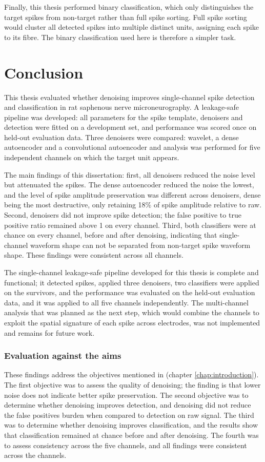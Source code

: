 \documentclass[ %
                    author={Rzan Alkabier},
                    supervisor={Dr. Zahraa Abdallah},
                    degree={MSc},
                     title={Denoising Extracellular Recording for Spike Detection and Classification on Single Channels},
                    subtitle={Does denoising improve detection and classification performance?},
                      type={},
                      year={2026}]{dissertation}
\begin{document}
\noindent
Finally, this thesis performed binary classification, which only distinguishes the target spikes from non-target rather than full spike sorting. Full spike sorting would cluster all detected spikes into multiple distinct units, assigning each spike to its fibre. The binary classification used here is therefore a simpler task. 
\chapter{Conclusion}
\label{chap:conclusion}
This thesis evaluated whether denoising improves single-channel spike detection and classification in rat saphenous nerve microneurography. A leakage-safe pipeline was developed: all parameters for the spike template, denoisers and detection were fitted on a development set, and performance was scored once on held-out evaluation data. Three denoisers were compared: wavelet, a dense autoencoder and a convolutional autoencoder and analysis was performed for five independent channels on which the target unit appears.  
\bigskip

\noindent
The main findings of this dissertation: first, all denoisers reduced the noise level but attenuated the spikes. The dense autoencoder reduced the noise the lowest, and the level of spike amplitude preservation was different across denoisers, dense being the most destructive, only retaining 18\% of spike amplitude relative to raw. Second, denoisers did not improve spike detection; the false positive to true positive ratio remained above 1 on every channel. Third, both classifiers were at chance on every channel, before and after denoising, indicating that single-channel waveform shape can not be separated from non-target spike waveform shape. These findings were consistent across all channels.
\bigskip

\noindent
The single-channel leakage-safe pipeline developed for this thesis is complete and functional; it detected spikes, applied three denoisers, two classifiers were applied on the survivors, and the performance was evaluated on the held-out evaluation data, and it was applied to all five channels independently. 
The multi-channel analysis that was planned as the next step, which would combine the channels to exploit the spatial signature of each spike across electrodes, was not implemented and remains for future work.

\subsection{Evaluation against the aims}
These findings address the objectives mentioned in (chapter \ref{chap:introduction}). The first objective was to assess the quality of denoising; the finding is that lower noise does not indicate better spike preservation. The second objective was to determine whether denoising improves detection, and denoising did not reduce the false positives burden when compared to detection on raw signal. The third was to determine whether denoising improves classification, and the results show that classification remained at chance before and after denoising. The fourth was to assess consistency across the five channels, and all findings were consistent across the channels. 
\bigskip
\end{document}
